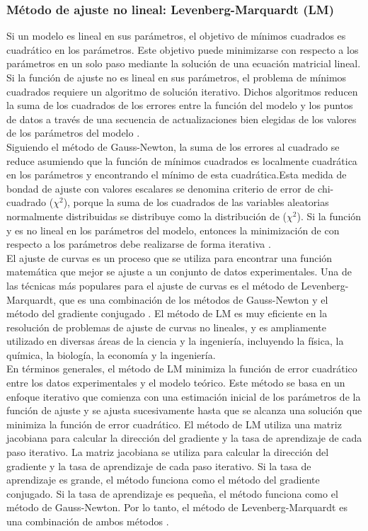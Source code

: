 \subsubsection{Método de ajuste no lineal: Levenberg-Marquardt (LM)}

Si un modelo es lineal en sus parámetros, el objetivo de mínimos cuadrados es cuadrático en los parámetros. Este objetivo puede minimizarse con respecto a los parámetros en un solo paso mediante la solución de una ecuación matricial lineal. Si la función de ajuste no es lineal en sus parámetros, el problema de mínimos cuadrados requiere un algoritmo de solución iterativo. Dichos algoritmos reducen la suma de los cuadrados de los errores entre la función del modelo y los puntos de datos a través de una secuencia de actualizaciones bien elegidas de los valores de los parámetros del modelo \cite{levenberduke}.\\

Siguiendo el método de Gauss-Newton, la suma de los errores al cuadrado se reduce asumiendo que la función de mínimos cuadrados es localmente cuadrática en los parámetros y encontrando el mínimo de esta cuadrática.Esta medida de bondad de ajuste con valores escalares se denomina criterio de error de chi-cuadrado ($\chi^{2}$), porque la suma de los cuadrados de las variables aleatorias normalmente distribuidas se distribuye como la distribución de ($\chi^{2}$). Si la función y es no lineal en los parámetros del modelo, entonces la minimización de con respecto a los parámetros debe realizarse de forma iterativa \cite{levenberduke}. \\

El ajuste de curvas es un proceso que se utiliza para encontrar una función matemática que mejor se ajuste a un conjunto de datos experimentales. Una de las técnicas más populares para el ajuste de curvas es el método de Levenberg-Marquardt, que es una combinación de los métodos de Gauss-Newton y el método del gradiente conjugado \cite{levenberduke}. El método de LM es muy eficiente en la resolución de problemas de ajuste de curvas no lineales, y es ampliamente utilizado en diversas áreas de la ciencia y la ingeniería, incluyendo la física, la química, la biología, la economía y la ingeniería.\\


En términos generales, el método de LM minimiza la función de error cuadrático entre los datos experimentales y el modelo teórico. Este método se basa en un enfoque iterativo que comienza con una estimación inicial de los parámetros de la función de ajuste y se ajusta sucesivamente hasta que se alcanza una solución que minimiza la función de error cuadrático. El método de LM utiliza una matriz jacobiana para calcular la dirección del gradiente y la tasa de aprendizaje de cada paso iterativo. La matriz jacobiana se utiliza para calcular la dirección del gradiente y la tasa de aprendizaje de cada paso iterativo. Si la tasa de aprendizaje es grande, el método funciona como el método del gradiente conjugado. Si la tasa de aprendizaje es pequeña, el método funciona como el método de Gauss-Newton. Por lo tanto, el método de Levenberg-Marquardt es una combinación de ambos métodos \cite{levenberduke}.\\


